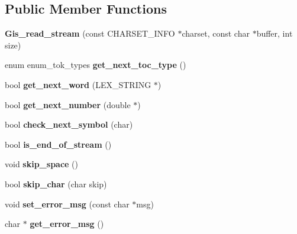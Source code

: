 \subsection*{Public Member Functions}
\begin{DoxyCompactItemize}
\item 
\mbox{\label{classGis__read__stream_aa6d49b2701aec881ea424fad279cb00d}} 
{\bfseries Gis\+\_\+read\+\_\+stream} (const C\+H\+A\+R\+S\+E\+T\+\_\+\+I\+N\+FO $\ast$charset, const char $\ast$buffer, int size)
\item 
\mbox{\label{classGis__read__stream_a8c589a8fffd9809a4f64f71e48f604b3}} 
enum enum\+\_\+tok\+\_\+types {\bfseries get\+\_\+next\+\_\+toc\+\_\+type} ()
\item 
\mbox{\label{classGis__read__stream_a4b71b7d4b7a65445ae76c65069cb4b24}} 
bool {\bfseries get\+\_\+next\+\_\+word} (L\+E\+X\+\_\+\+S\+T\+R\+I\+NG $\ast$)
\item 
\mbox{\label{classGis__read__stream_a48cf425d2f028a3c42264a845a3b7c79}} 
bool {\bfseries get\+\_\+next\+\_\+number} (double $\ast$)
\item 
\mbox{\label{classGis__read__stream_a7ac6848bd87a1ff8b4dcc9ccfc29a7e2}} 
bool {\bfseries check\+\_\+next\+\_\+symbol} (char)
\item 
\mbox{\label{classGis__read__stream_a5e0b4c4f59d72a1c719ac1c3db9fe708}} 
bool {\bfseries is\+\_\+end\+\_\+of\+\_\+stream} ()
\item 
\mbox{\label{classGis__read__stream_a11dc2762100d6a0c2361422c7dbaf1d2}} 
void {\bfseries skip\+\_\+space} ()
\item 
\mbox{\label{classGis__read__stream_ae0552452209673117c864986014965ed}} 
bool {\bfseries skip\+\_\+char} (char skip)
\item 
\mbox{\label{classGis__read__stream_a990a0c5432a4051c1d04891792055612}} 
void {\bfseries set\+\_\+error\+\_\+msg} (const char $\ast$msg)
\item 
\mbox{\label{classGis__read__stream_a05bf0daeed20f9375e27a02790500155}} 
char $\ast$ {\bfseries get\+\_\+error\+\_\+msg} ()
\end{DoxyCompactItemize}
